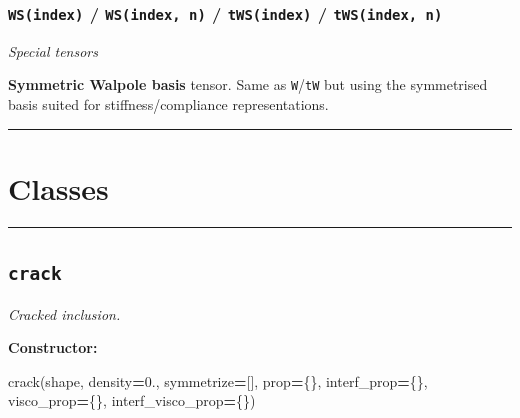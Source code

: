 \documentclass[
  a4paper,
  numbers=noendperiod,
  DIV=12]{scrreprt}
\newenvironment{Shaded}{\begin{snugshade}}{\end{snugshade}}
\newcommand{\FloatTok}[1]{\textcolor[rgb]{0.00,0.00,0.81}{#1}}
\newcommand{\NormalTok}[1]{#1}
\newcommand{\OperatorTok}[1]{\textcolor[rgb]{0.81,0.36,0.00}{\textbf{#1}}}
\begin{document}
\subsubsection{\texorpdfstring{\texttt{WS(index)} /
\texttt{WS(index,\ n)} / \texttt{tWS(index)} /
\texttt{tWS(index,\ n)}}{WS(index) / WS(index, n) / tWS(index) / tWS(index, n)}}\label{api-WS}

\emph{Special tensors}

\textbf{Symmetric Walpole basis} tensor. Same as \texttt{W}/\texttt{tW}
but using the symmetrised basis suited for stiffness/compliance
representations.

\begin{center}\rule{0.5\linewidth}{0.5pt}\end{center}

\section{Classes}\label{sec-api-classes}

\begin{center}\rule{0.5\linewidth}{0.5pt}\end{center}

\subsection{\texorpdfstring{\texttt{crack}}{crack}}\label{api-crack}

\emph{Cracked inclusion.}

\textbf{Constructor:}

\begin{Shaded}
\begin{Highlighting}[]
\NormalTok{crack(shape, density}\OperatorTok{=}\FloatTok{0.}\NormalTok{, symmetrize}\OperatorTok{=}\NormalTok{[], prop}\OperatorTok{=}\NormalTok{\{\},}
\NormalTok{      interf\_prop}\OperatorTok{=}\NormalTok{\{\}, visco\_prop}\OperatorTok{=}\NormalTok{\{\}, interf\_visco\_prop}\OperatorTok{=}\NormalTok{\{\})}
\end{Highlighting}
\end{Shaded}
\end{document}
